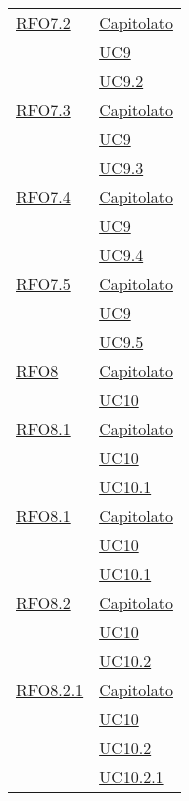 \begin{longtable}{|>{\centering}m{5cm}|m{5cm}<{\centering}|}
   \hyperlink{RFO7.2}{RFO7.2} & \hyperlink{Capitolato}{Capitolato}\\
   & \hyperref[UC9]{UC9}\\
   & \hyperref[UC9.2]{UC9.2}\\\hline
   
    \hyperlink{RFO7.3}{RFO7.3} & \hyperlink{Capitolato}{Capitolato}\\
   & \hyperref[UC9]{UC9}\\
   & \hyperref[UC9.3]{UC9.3}\\\hline
   
   \hyperlink{RFO7.4}{RFO7.4} & \hyperlink{Capitolato}{Capitolato}\\
   & \hyperref[UC9]{UC9}\\
   & \hyperref[UC9.4]{UC9.4}\\\hline
   
   \hyperlink{RFO7.5}{RFO7.5} & \hyperlink{Capitolato}{Capitolato}\\
   & \hyperref[UC9]{UC9}\\
   & \hyperref[UC9.5]{UC9.5}\\\hline
   
   \hyperlink{RFO8}{RFO8} & \hyperlink{Capitolato}{Capitolato}\\
   & \hyperref[UC10]{UC10}\\\hline
   
      \hyperlink{RFO8.1}{RFO8.1} & \hyperlink{Capitolato}{Capitolato}\\
   & \hyperref[UC10]{UC10}\\
      & \hyperref[UC10.1]{UC10.1}\\\hline
      
    \hyperlink{RFO8.1}{RFO8.1} & \hyperlink{Capitolato}{Capitolato}\\
  & \hyperref[UC10]{UC10}\\
  & \hyperref[UC10.1]{UC10.1}\\\hline
  
      \hyperlink{RFO8.2}{RFO8.2} & \hyperlink{Capitolato}{Capitolato}\\
  & \hyperref[UC10]{UC10}\\
  & \hyperref[UC10.2]{UC10.2}\\\hline
  
      \hyperlink{RFO8.2.1}{RFO8.2.1} & \hyperlink{Capitolato}{Capitolato}\\
  & \hyperref[UC10]{UC10}\\
  & \hyperref[UC10.2]{UC10.2}\\
   & \hyperref[UC10.2.1]{UC10.2.1}\\\hline
   

\end{longtable}
